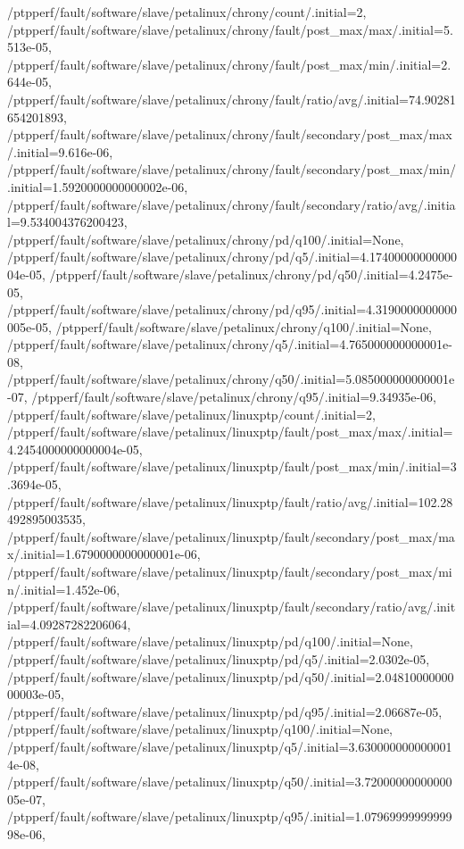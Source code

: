 {    /ptpperf/fault/software/slave/petalinux/chrony/count/.initial=2,
    /ptpperf/fault/software/slave/petalinux/chrony/fault/post_max/max/.initial=5.513e-05,
    /ptpperf/fault/software/slave/petalinux/chrony/fault/post_max/min/.initial=2.644e-05,
    /ptpperf/fault/software/slave/petalinux/chrony/fault/ratio/avg/.initial=74.90281654201893,
    /ptpperf/fault/software/slave/petalinux/chrony/fault/secondary/post_max/max/.initial=9.616e-06,
    /ptpperf/fault/software/slave/petalinux/chrony/fault/secondary/post_max/min/.initial=1.5920000000000002e-06,
    /ptpperf/fault/software/slave/petalinux/chrony/fault/secondary/ratio/avg/.initial=9.534004376200423,
    /ptpperf/fault/software/slave/petalinux/chrony/pd/q100/.initial=None,
    /ptpperf/fault/software/slave/petalinux/chrony/pd/q5/.initial=4.1740000000000004e-05,
    /ptpperf/fault/software/slave/petalinux/chrony/pd/q50/.initial=4.2475e-05,
    /ptpperf/fault/software/slave/petalinux/chrony/pd/q95/.initial=4.3190000000000005e-05,
    /ptpperf/fault/software/slave/petalinux/chrony/q100/.initial=None,
    /ptpperf/fault/software/slave/petalinux/chrony/q5/.initial=4.765000000000001e-08,
    /ptpperf/fault/software/slave/petalinux/chrony/q50/.initial=5.085000000000001e-07,
    /ptpperf/fault/software/slave/petalinux/chrony/q95/.initial=9.34935e-06,
    /ptpperf/fault/software/slave/petalinux/linuxptp/count/.initial=2,
    /ptpperf/fault/software/slave/petalinux/linuxptp/fault/post_max/max/.initial=4.2454000000000004e-05,
    /ptpperf/fault/software/slave/petalinux/linuxptp/fault/post_max/min/.initial=3.3694e-05,
    /ptpperf/fault/software/slave/petalinux/linuxptp/fault/ratio/avg/.initial=102.28492895003535,
    /ptpperf/fault/software/slave/petalinux/linuxptp/fault/secondary/post_max/max/.initial=1.6790000000000001e-06,
    /ptpperf/fault/software/slave/petalinux/linuxptp/fault/secondary/post_max/min/.initial=1.452e-06,
    /ptpperf/fault/software/slave/petalinux/linuxptp/fault/secondary/ratio/avg/.initial=4.09287282206064,
    /ptpperf/fault/software/slave/petalinux/linuxptp/pd/q100/.initial=None,
    /ptpperf/fault/software/slave/petalinux/linuxptp/pd/q5/.initial=2.0302e-05,
    /ptpperf/fault/software/slave/petalinux/linuxptp/pd/q50/.initial=2.0481000000000003e-05,
    /ptpperf/fault/software/slave/petalinux/linuxptp/pd/q95/.initial=2.06687e-05,
    /ptpperf/fault/software/slave/petalinux/linuxptp/q100/.initial=None,
    /ptpperf/fault/software/slave/petalinux/linuxptp/q5/.initial=3.6300000000000014e-08,
    /ptpperf/fault/software/slave/petalinux/linuxptp/q50/.initial=3.7200000000000005e-07,
    /ptpperf/fault/software/slave/petalinux/linuxptp/q95/.initial=1.0796999999999998e-06,
}
